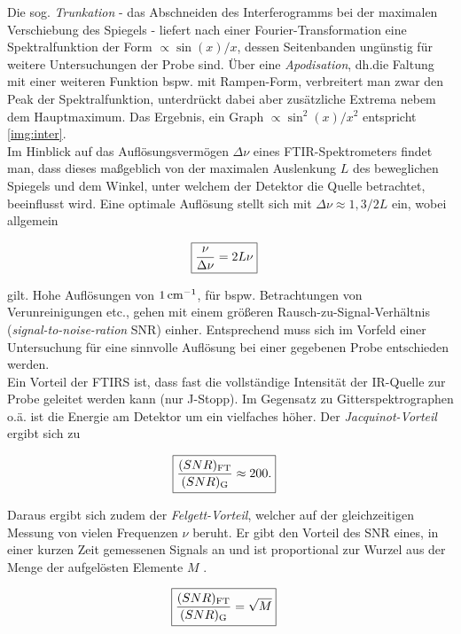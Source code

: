 \documentclass[a4paper,10pt,twocolumn]{article}
\newcommand{\ix}[1]{_\text{#1}}
\newcommand{\tilt}[1]{\textit{#1}}
\begin{document}
		Die sog. \tilt{Trunkation} - das Abschneiden des Interferogramms bei der maximalen Verschiebung des Spiegels - liefert nach einer Fourier-Transformation eine Spektralfunktion der Form $\propto\sin(x)/x$, dessen Seitenbanden ung\"unstig f\"ur weitere Untersuchungen der Probe sind. \"Uber eine \tilt{Apodisation}, dh.die Faltung mit einer weiteren Funktion bspw. mit Rampen-Form, verbreitert man zwar den Peak der Spektralfunktion, unterdr\"uckt dabei aber zus\"atzliche Extrema nebem dem Hauptmaximum. Das Ergebnis, ein Graph $\propto\sin^{2}(x)/x^{2}$ entspricht \autoref{img:inter}.\\
		Im Hinblick auf das Aufl\"osungsverm\"ogen $\Delta\nu$ eines FTIR-Spektrometers findet man, dass dieses ma{\ss}geblich von der maximalen Auslenkung $L$ des beweglichen Spiegels und dem Winkel, unter welchem der Detektor die Quelle betrachtet, beeinflusst wird. Eine optimale Aufl\"osung stellt sich mit $\Delta\nu\approx1,3/2L$ ein, wobei allgemein
		
		\begin{align}
			\Aboxed{
			\frac{\nu}{\Delta\nu}=2L\nu
			} \nonumber
		\end{align} 
		
		gilt. Hohe Aufl\"osungen von $\unit[1]{cm^{-1}}$, f\"ur bspw. Betrachtungen von Verunreinigungen etc., gehen mit einem gr\"o{\ss}eren Rausch-zu-Signal-Verh\"altnis (\tilt{signal-to-noise-ration} SNR) einher. Entsprechend muss sich im Vorfeld einer Untersuchung f\"ur eine sinnvolle Aufl\"osung bei einer gegebenen Probe entschieden werden.\\
		Ein Vorteil der FTIRS ist, dass fast die vollst\"andige Intensit\"at der IR-Quelle zur Probe geleitet werden kann (nur J-Stopp). Im Gegensatz zu Gitterspektrographen o.\"a. ist die Energie am Detektor um ein vielfaches h\"oher. Der \tilt{Jacquinot-Vorteil} ergibt sich zu
		
		\begin{align}
			\Aboxed{
			\frac{(SNR)\ix{FT}}{(SNR)\ix{G}}\approx200.
			} \nonumber
		\end{align} 
		
		Daraus ergibt sich zudem der \tilt{Felgett-Vorteil}, welcher auf der gleichzeitigen Messung von vielen Frequenzen $\nu$ beruht. Er gibt den Vorteil des SNR eines, in einer kurzen Zeit gemessenen Signals an und ist proportional zur Wurzel aus der Menge der aufgel\"osten Elemente $M$ \cite{FTIRAns}.
		
		\begin{align}
			\Aboxed{
			\frac{(SNR)\ix{FT}}{(SNR)\ix{G}}=\sqrt{M}
			} \nonumber
		\end{align}
		
\end{document}
